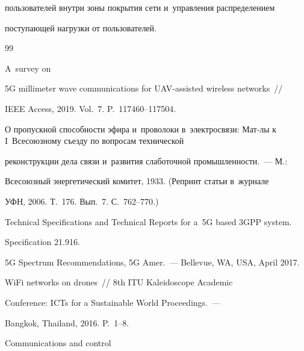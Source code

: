 пользователей внутри зоны покрытия сети и~управления распределением 


поступающей нагрузки от пользователей.


  


{\small\frenchspacing


{%




\begin{thebibliography}{99}




 A~survey on 


5G millimeter wave communications for UAV-assisted wireless networks~/\!\!/ 


IEEE Access, 2019. Vol.~7. P.~117460--117504.




 О пропускной способности эфира и~проволоки в~электросвязи: Мат-лы к I~Всесоюзному съезду по вопросам технической 


реконструкции дела связи и~развития слаботочной промышленности.~--- М.: 


Всесоюзный энергетический комитет, 1933. (Репринт статьи в~журнале 


УФН, 2006. Т.~176. Вып.~7. С.~762--770.)




Technical Specifications and Technical Reports for a~5G based 3GPP system. 


Specification 21.916.




5G Spectrum Recommendations, 5G Amer.~--- Bellevue, WA, USA, April 2017.




 WiFi networks on drones~/\!\!/ 8th ITU Kaleidoscope Academic 


Conference: ICTs for a Sustainable World Proceedings.~--- 


Bangkok, Thailand, 2016. P.~1--8.




 Communications and control 



\end{thebibliography}}}
